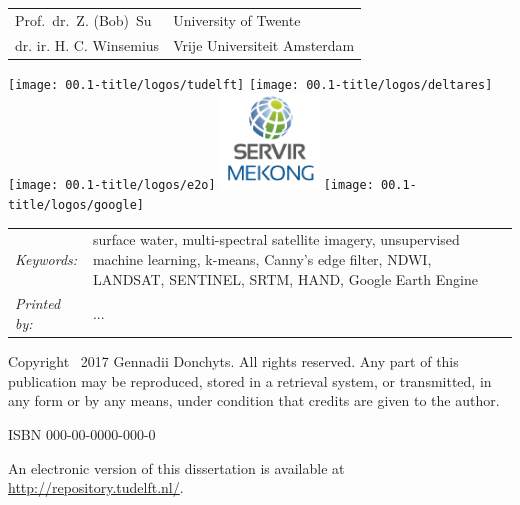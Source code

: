 \begin{titlepage}
\begin{tabular}{p{5cm}l}
	Prof.\ dr.\ Z. (Bob)\ Su & University of Twente \\
		
	dr. ir. H. C. Winsemius & Vrije Universiteit Amsterdam \\
	
\end{tabular}

\medskip

\vfill

\begin{center}
	\texttt{[image: 00.1-title/logos/tudelft]}
	\hspace{1em} 
	\texttt{[image: 00.1-title/logos/deltares]}
	\hspace{1em} \vspace{1em} 
	\texttt{[image: 00.1-title/logos/e2o]} 
	\hspace{1em}
	\includegraphics[height=1.0in]{00.1-title/logos/SERVIR-Mekong} 
	\hspace{1em}
	\texttt{[image: 00.1-title/logos/google]} 
\end{center}
\vfill

\noindent
\begin{tabular}{@{}p{}@{}p{}}
	\textit{Keywords:} & {surface water, multi-spectral satellite imagery, unsupervised machine learning, k-means, Canny's edge filter, NDWI, LANDSAT, SENTINEL, SRTM, HAND, Google Earth Engine} \\[\medskipamount]
	
	\textit{Printed by:} & ... \\[\medskipamount]
\end{tabular}

\vspace{4\bigskipamount}

\noindent Copyright \textcopyright\ 2017 Gennadii Donchyts. All rights reserved. Any part of this publication may be reproduced, stored in a retrieval system, or transmitted, in any form or by any means, under condition that credits are given to the author.

\medskip
\noindent ISBN 000-00-0000-000-0

\medskip
\noindent An electronic version of this dissertation is available at \\
\url{http://repository.tudelft.nl/}.

\end{titlepage}

